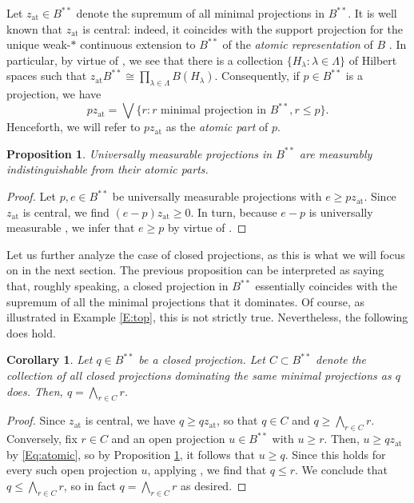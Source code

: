 \documentclass[10pt]{amsart}
\newcommand{\at}{\operatorname{at}}
\newtheorem{proposition}[lemma]{Proposition}
\newtheorem{corollary}[lemma]{Corollary}
\theoremstyle{definition}
\begin{document}
Let $z_{\at}\in B^{**}$ denote the supremum of all minimal projections in $B^{**}$. It is well known that $z_{\at}$ is central: indeed, it coincides with the support projection for the unique weak-$*$ continuous extension to $B^{**}$ of the \emph{atomic representation} of $B$ \cite[Paragraph 4.3.7]{pedersen1979book}. In particular, by virtue of \cite[Lemma 4.3.8]{pedersen1979book}, we see that there is a collection $\{H_\lambda:\lambda\in \Lambda\}$ of Hilbert spaces such that $z_{\at}B^{**}\cong \prod_{\lambda\in \Lambda} B(H_\lambda)$. Consequently, if $p\in B^{**}$ is a projection, we have
\begin{equation}\label{Eq:atomic}
pz_{\at}=\bigvee\{ r: r \text{ minimal projection in } B^{**}, r\leq p\}.
\end{equation}
Henceforth, we will refer to $pz_{\at}$ as the \emph{atomic part} of $p$.  

\begin{proposition}\label{P:induniv}
Universally measurable projections in $B^{**}$ are measurably indistinguishable from their atomic parts.
\end{proposition} 
\begin{proof} 
Let $p,e\in B^{**}$ be universally measurable projections  with $e\geq pz_{\at}$. Since $z_{\at}$ is central, we find $(e-p)z_{\at}\geq 0$.  In turn, because $e-p$ is universally measurable \cite[Proposition 4.3.13]{pedersen1979book},  we  infer that $e\geq p$ by virtue of  \cite[Theorem 4.3.15]{pedersen1979book}.
 \end{proof}



Let us further analyze the case of closed projections, as this is what we will focus on in the next section.  The previous proposition can be interpreted as saying that, roughly speaking, a closed projection in $B^{**}$ essentially coincides with the supremum of all the minimal projections that it dominates. Of course, as illustrated in Example \ref{E:top}, this is not strictly true. Nevertheless, the following does hold.

\begin{corollary}\label{P:topindclosed}
Let $q\in B^{**}$ be a closed projection. Let $C\subset B^{**}$ denote the collection of all closed projections dominating the same minimal projections as $q$ does. Then, $q=\bigwedge_{r\in C} r$. 
\end{corollary} 
\begin{proof}
Since $z_{\at}$ is central, we have $q\geq qz_{\at}$, so  that $q\in C$ and $q\geq \bigwedge_{r\in C} r$. Conversely, fix $r\in C$ and an open projection $u\in B^{**}$ with $u\geq r$. Then, $u\geq qz_{\at}$ by \eqref{Eq:atomic}, so by Proposition \ref{P:induniv}, it follows that $u\geq q$. Since this holds for every such open projection $u$, applying \cite[Proposition 2.3]{hay2007}, we find that $q\leq r$. We conclude that $q\leq  \bigwedge_{r\in C} r$, so in fact $q=\bigwedge_{r\in C} r$ as desired. 
 \end{proof}
\end{document}
